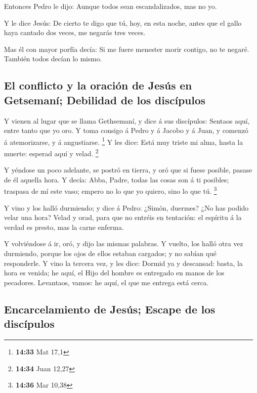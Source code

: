  Entonces Pedro le dijo: Aunque todos sean
escandalizados, mas no yo.

 Y le dice Jesús: De cierto te digo que tú, hoy, en esta
noche, antes que el gallo haya cantado dos veces, me negarás tres veces.

 Mas él con mayor porfía decía: Si me fuere menester
morir contigo, no te negaré. También todos decían lo mismo.

\hypertarget{el-conflicto-y-la-oraciuxf3n-de-jesuxfas-en-getsemanuxed-debilidad-de-los-discuxedpulos}{%
\subsection{El conflicto y la oración de Jesús en Getsemaní; Debilidad
de los
discípulos}\label{el-conflicto-y-la-oraciuxf3n-de-jesuxfas-en-getsemanuxed-debilidad-de-los-discuxedpulos}}

 Y vienen al lugar que se llama Gethsemaní, y dice á sus
discípulos: Sentaos aquí, entre tanto que yo oro.  Y toma
consigo á Pedro y á Jacobo y á Juan, y comenzó á atemorizarse, y á
angustiarse. \footnote{\textbf{14:33} Mat 17,1}  Y les
dice: Está muy triste mi alma, hasta la muerte: esperad aquí y velad.
\footnote{\textbf{14:34} Juan 12,27}

 Y yéndose un poco adelante, se postró en tierra, y oró
que si fuese posible, pasase de él aquella hora.  Y
decía: Abba, Padre, todas las cosas son á ti posibles; traspasa de mí
este vaso; empero no lo que yo quiero, sino lo que tú. \footnote{\textbf{14:36}
  Mar 10,38}

 Y vino y los halló durmiendo; y dice á Pedro: ¿Simón,
duermes? ¿No has podido velar una hora?  Velad y orad,
para que no entréis en tentación: el espíritu á la verdad es presto, mas
la carne enferma.

 Y volviéndose á ir, oró, y dijo las mismas palabras.
 Y vuelto, los halló otra vez durmiendo, porque los ojos
de ellos estaban cargados; y no sabían qué responderle. 
Y vino la tercera vez, y les dice: Dormid ya y descansad: basta, la hora
es venida; he aquí, el Hijo del hombre es entregado en manos de los
pecadores.  Levantaos, vamos: he aquí, el que me entrega
está cerca.

\hypertarget{encarcelamiento-de-jesuxfas-escape-de-los-discuxedpulos}{%
\subsection{Encarcelamiento de Jesús; Escape de los
discípulos}\label{encarcelamiento-de-jesuxfas-escape-de-los-discuxedpulos}}

